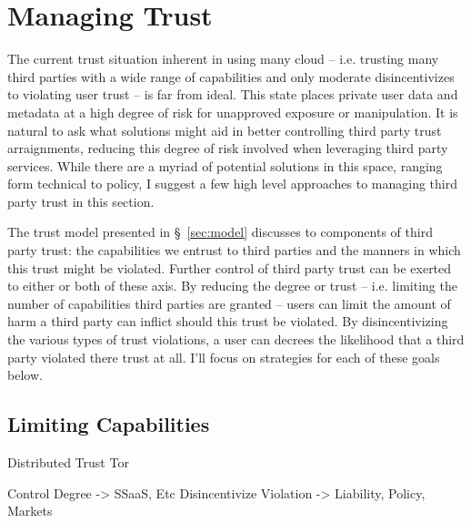 \section{Managing Trust}
\label{sec:mitigation}

The current trust situation inherent in using many cloud --
i.e. trusting many third parties with a wide range of capabilities and
only moderate disincentivizes to violating user trust -- is far from
ideal. This state places private user data and metadata at a high
degree of risk for unapproved exposure or manipulation. It is natural
to ask what solutions might aid in better controlling third party
trust arraignments, reducing this degree of risk involved when
leveraging third party services. While there are a myriad of potential
solutions in this space, ranging form technical to policy, I suggest a
few high level approaches to managing third party trust in this
section.

The trust model presented in \S~\ref{sec:model} discusses to
components of third party trust: the capabilities we entrust to third
parties and the manners in which this trust might be violated. Further
control of third party trust can be exerted to either or both of these
axis. By reducing the degree or trust -- i.e. limiting the number of
capabilities third parties are granted -- users can limit the amount
of harm a third party can inflict should this trust be violated. By
disincentivizing the various types of trust violations, a user can
decrees the likelihood that a third party violated there trust at
all. I'll focus on strategies for each of these goals below.

\subsection{Limiting Capabilities}



Distributed Trust
Tor

Control Degree -> SSaaS, Etc
Disincentivize Violation -> Liability, Policy, Markets
